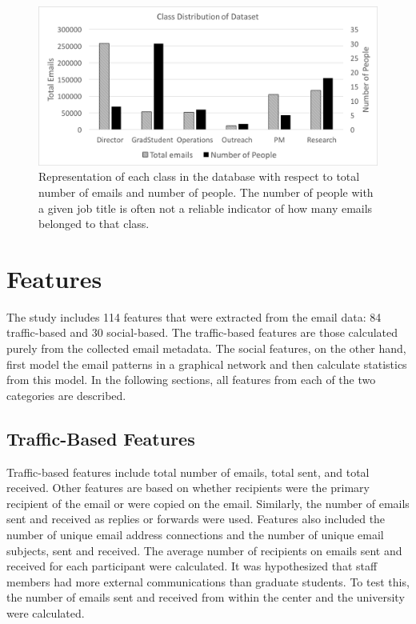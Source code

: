 \documentclass[10pt,twocolumn,conference]{IEEEtran}
\begin{document}
\begin{figure}[t]
	\centering
	\includegraphics[width=\columnwidth,trim={1mm 5mm 1mm 5mm},clip]{DatasetStatsBar_BW}
	\caption{Representation of each class in the database with respect to total number of emails and number of people.  The number of people with a given job title is often not a reliable indicator of how many emails belonged to that class.}
	\vspace{-17pt}
	\label{fig:db_bar}
\end{figure}


\section{Features} \label{Features}
The study includes 114 features that were extracted from the email data: 84 traffic-based and 30 social-based.
The traffic-based features are those calculated purely from the collected email metadata.
The social features, on the other hand, first model the email patterns in a graphical network and then calculate statistics from this model.
In the following sections, all features from each of the two categories are described. 

\subsection{Traffic-Based Features}
Traffic-based features include total number of emails, total sent, and total received.
Other features are based on whether recipients were the primary recipient of the email or were copied on the email.
Similarly, the number of emails sent and received as replies or forwards were used.
Features also included the number of unique email address connections and the number of unique email subjects, sent and received.
The average number of recipients on emails sent and received for each participant were calculated.
It was hypothesized that staff members had more external communications than graduate students.
To test this, the number of emails sent and received from within the center and the university were calculated.  
\end{document}
